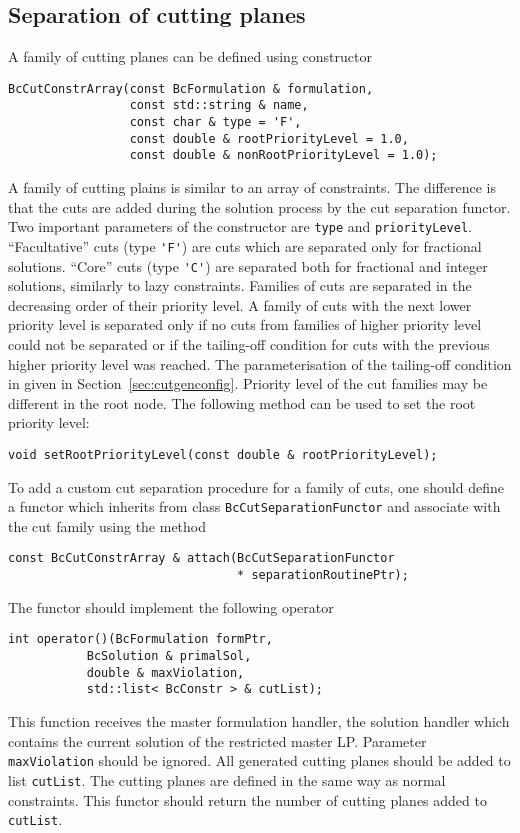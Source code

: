 \documentclass[10pt,a4paper]{article}
\begin{document}
\subsection{Separation of cutting planes}
\label{sec:cutseparation}

A family of cutting planes can be defined using constructor
\begin{lstlisting}
BcCutConstrArray(const BcFormulation & formulation,
                 const std::string & name,
                 const char & type = 'F',
                 const double & rootPriorityLevel = 1.0,
                 const double & nonRootPriorityLevel = 1.0);
\end{lstlisting}
A family of cutting plains is similar to an array of constraints. The difference is that the cuts are added during the
solution process by the cut separation functor. Two important parameters of the constructor are \verb+type+ and
\verb+priorityLevel+. ``Facultative'' cuts (type \verb+'F'+) are cuts which are separated only for fractional
solutions. ``Core'' cuts (type \verb+'C'+) are separated both for fractional and integer solutions, similarly to lazy
constraints. Families of cuts are separated in the decreasing order of their priority level. A family of cuts with the
next lower priority level is separated only if no cuts from families of higher priority level could not be separated or
if the tailing-off condition for cuts with the previous higher priority level was reached. The parameterisation of the
tailing-off condition in given in Section~\ref{sec:cutgenconfig}. Priority level of the cut families may be different in
the root node. The following method can be used to set the root priority level:
\begin{lstlisting}
void setRootPriorityLevel(const double & rootPriorityLevel);
\end{lstlisting}

To add a custom cut separation procedure for a family of cuts, one should define a functor which inherits from class
\verb+BcCutSeparationFunctor+ and associate with the cut family using the method
\begin{lstlisting}
const BcCutConstrArray & attach(BcCutSeparationFunctor 
                                * separationRoutinePtr);
\end{lstlisting}
The functor should implement the following operator
\begin{lstlisting}
int operator()(BcFormulation formPtr,
	       BcSolution & primalSol,
	       double & maxViolation,
	       std::list< BcConstr > & cutList);
\end{lstlisting}
This function receives the master formulation handler, the solution handler which contains the current solution of the
restricted master LP. Parameter \verb+maxViolation+ should be ignored. All generated cutting planes should be added to
list \verb+cutList+. The cutting planes are defined in the
same way as normal constraints. This functor should return the number of cutting planes added to \verb+cutList+.
\end{document}
